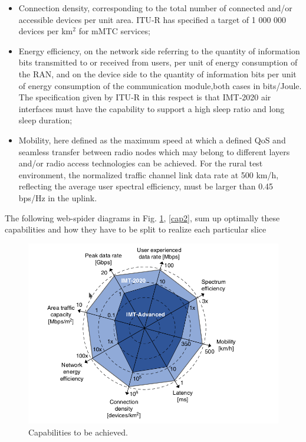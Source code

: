 \documentclass{report}
\begin{document}
\begin{itemize}
\item Connection density, corresponding to the total number of connected and/or accessible devices
per unit area. ITU‐R has specified a target of 1 000 000 devices per km$^2$ for mMTC services;
\end{itemize}
\begin{itemize}
\item Energy efficiency, on the network side referring to the quantity of information bits transmitted to or received from users, per unit of energy consumption of the RAN, and on the device side to the
quantity of information bits per unit of energy consumption of the communication module,both cases in bits/Joule. The specification given by ITU‐R in this respect is that IMT‐2020 air interfaces must have the capability to support a high sleep ratio and long sleep duration;
\end{itemize}
\begin{itemize}
\item Mobility, here defined as the maximum speed at which a defined QoS and
seamless transfer between radio nodes which may belong to different layers and/or radio access
technologies can be achieved. For the rural test environment, the normalized traffic channel link
data rate at 500 km/h, reflecting the average user spectral efficiency, must be larger than 0.45 bps/Hz
in the uplink.
\end{itemize}
The following web-spider diagrams in Fig. \ref{cap1}, \ref{cap2}, sum up optimally these capabilities and how they have to be split to realize each particular slice
\begin{figure}[h]
\centering
\includegraphics[scale=0.4]{pics/capabilities1.png}
\caption{Capabilities to be achieved.} 
\label{cap1}
\end{figure}
\end{document}
